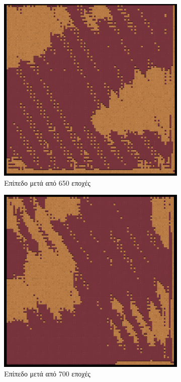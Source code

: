 \begin{figure}[H]
\begin{subfigure}{.5\textwidth}
  \centering
  \includegraphics[width=.8\linewidth]{../images/generated/650.png}
  \caption{Επίπεδο μετά από 650 εποχές}
  \label{fig:sfig1}
\end{subfigure}%
\begin{subfigure}{.5\textwidth}
  \centering
  \includegraphics[width=.8\linewidth]{../images/generated/700.png}
  \caption{Επίπεδο μετά από 700 εποχές}
  \label{fig:sfig2}
\end{subfigure}
\begin{subfigure}{.5\textwidth}

\end{subfigure}
\end{figure}
